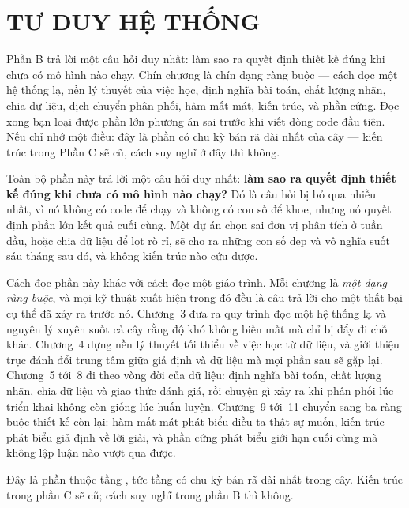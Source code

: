 \documentclass[../deep_learning.tex]{subfiles}
\begin{document}
\part{TƯ DUY HỆ THỐNG}
\begin{tomtat}
Phần B trả lời một câu hỏi duy nhất: làm sao ra quyết định thiết kế đúng khi chưa có mô hình nào chạy. Chín chương là chín dạng ràng buộc --- cách đọc một hệ thống lạ, nền lý thuyết của việc học, định nghĩa bài toán, chất lượng nhãn, chia dữ liệu, dịch chuyển phân phối, hàm mất mát, kiến trúc, và phần cứng. Đọc xong bạn loại được phần lớn phương án sai trước khi viết dòng code đầu tiên. Nếu chỉ nhớ một điều: đây là phần có chu kỳ bán rã dài nhất của cây --- kiến trúc trong Phần C sẽ cũ, cách suy nghĩ ở đây thì không.
\end{tomtat}

Toàn bộ phần này trả lời một câu hỏi duy nhất: \textbf{làm sao ra quyết định thiết kế đúng khi chưa có mô hình nào chạy?} Đó là câu hỏi bị bỏ qua nhiều nhất, vì nó không có code để chạy và không có con số để khoe, nhưng nó quyết định phần lớn kết quả cuối cùng. Một dự án chọn sai đơn vị phân tích ở tuần đầu, hoặc chia dữ liệu để lọt rò rỉ, sẽ cho ra những con số đẹp và vô nghĩa suốt sáu tháng sau đó, và không kiến trúc nào cứu được.

Cách đọc phần này khác với cách đọc một giáo trình. Mỗi chương là \emph{một dạng ràng buộc}, và mọi kỹ thuật xuất hiện trong đó đều là câu trả lời cho một thất bại cụ thể đã xảy ra trước nó. Chương~3 đưa ra quy trình đọc một hệ thống lạ và nguyên lý xuyên suốt cả cây rằng độ khó không biến mất mà chỉ bị đẩy đi chỗ khác. Chương~4 dựng nền lý thuyết tối thiểu về việc học từ dữ liệu, và giới thiệu trục đánh đổi trung tâm giữa giả định và dữ liệu mà mọi phần sau sẽ gặp lại. Chương~5 tới~8 đi theo vòng đời của dữ liệu: định nghĩa bài toán, chất lượng nhãn, chia dữ liệu và giao thức đánh giá, rồi chuyện gì xảy ra khi phân phối lúc triển khai không còn giống lúc huấn luyện. Chương~9 tới~11 chuyển sang ba ràng buộc thiết kế còn lại: hàm mất mát phát biểu điều ta thật sự muốn, kiến trúc phát biểu giả định về lời giải, và phần cứng phát biểu giới hạn cuối cùng mà không lập luận nào vượt qua được.

Đây là phần thuộc tầng , tức tầng có chu kỳ bán rã dài nhất trong cây. Kiến trúc trong phần C sẽ cũ; cách suy nghĩ trong phần B thì không.










\ifSubfilesClassLoaded{\printbibliography[title={Nguồn}]}{}
\end{document}
